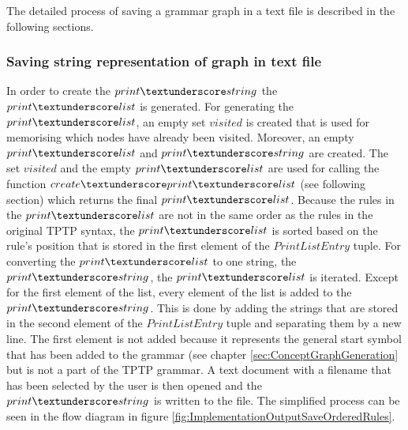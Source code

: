 The detailed process of saving a grammar graph in a text file is described in the following sections.

\subsubsection{Saving string representation of graph in text file}\label{sec:ImplementationOutputSaveGrammarGraphStringRepresentations}

In order to create the $print\textunderscore string$ the $print\textunderscore list$ is generated. For generating the $print\textunderscore list$, an empty set $visited$ is created that is used for memorising which nodes have already been visited. Moreover, an empty $print\textunderscore list$ and $print\textunderscore string$ are created. The set $visited$ and the empty $print\textunderscore list$ are used for calling the function $create\textunderscore print\textunderscore list$ (see following section) which returns the final $print\textunderscore list$. Because the rules in the $print\textunderscore list$ are not in the same order as the rules in the original \ac{TPTP} syntax, the $print\textunderscore list$ is sorted based on the rule's position that is stored in the first element of the $PrintListEntry$ tuple. For converting the $print\textunderscore list$ to one string, the $print\textunderscore string$, the $print\textunderscore list$ is iterated. Except for the first element of the list, every element of the list is added to the $print\textunderscore string$. This is done by adding the strings that are stored in the second element of the $PrintListEntry$ tuple and separating them by a new line. The first element is not added because it represents the general start symbol that has been added to the grammar (see chapter \ref{sec:ConceptGraphGeneration} but is not a part of the \ac{TPTP} grammar. A text document with a filename that has been selected by the user is then opened and the $print\textunderscore string$ is written to the file.
The simplified process can be seen in the flow diagram in figure \ref{fig:ImplementationOutputSaveOrderedRules}.

